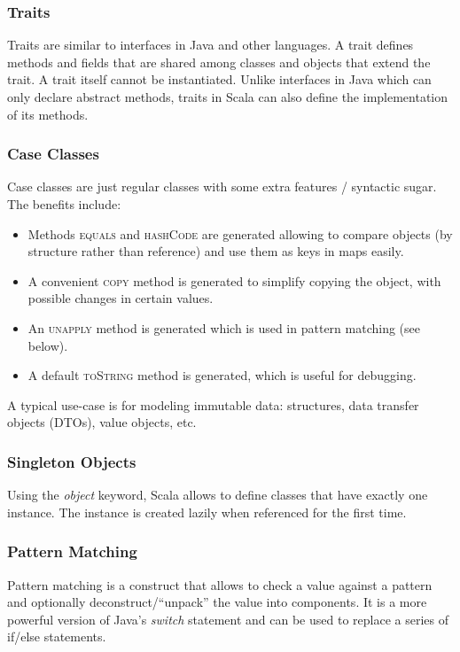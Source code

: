 \subsubsection{Traits}
Traits are similar to interfaces in Java and other languages.
A trait defines methods and fields that are shared among classes and objects that extend the trait.
A trait itself cannot be instantiated.
Unlike interfaces in Java which can only declare abstract methods, traits in Scala can also define the implementation of its methods.

\subsubsection{Case Classes}
Case classes are just regular classes with some extra features / syntactic sugar.
The benefits include:
\begin{itemize}
  \item Methods \textsc{equals} and \textsc{hashCode} are generated allowing to compare objects (by structure rather than reference) and use them as keys in maps easily.
  \item A convenient \textsc{copy} method is generated to simplify copying the object, with possible changes in certain values.
  \item An \textsc{unapply} method is generated which is used in pattern matching (see below).
  \item A default \textsc{toString} method is generated, which is useful for debugging.
\end{itemize}

A typical use-case is for modeling immutable data: structures, data transfer objects (DTOs), value objects, etc.


\subsubsection{Singleton Objects}
Using the \textit{object} keyword, Scala allows to define classes that have exactly one instance.
The instance is created lazily when referenced for the first time.

\subsubsection{Pattern Matching}
Pattern matching is a construct that allows to check a value against a pattern and optionally deconstruct/\enquote{unpack} the value into components.
It is a more powerful version of Java's \textit{switch} statement and can be used to replace a series of if/else statements.

